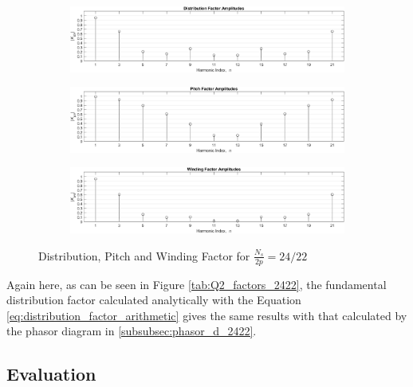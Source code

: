 \documentclass[a4paper, 11pt]{article}
\begin{document}
\begin{figure}[h!]
    \centering
    \begin{subfigure}[b]{1.00\textwidth}
        \includegraphics[width=\textwidth]{Q2_2422_distributionFactor.png}
        \caption{}
        \label{subfig:Q2_dist_factor_2422}
    \end{subfigure}
    \begin{subfigure}[b]{1.00\textwidth}
        \includegraphics[width=\textwidth]{Q2_2422_pitchFactor.png}
        \caption{}
        \label{subfig:Q2_pitch_factor_2422}
    \end{subfigure}
    \begin{subfigure}[b]{1.00\textwidth}
        \includegraphics[width=\textwidth]{Q2_2422_windingFactor.png}
        \caption{}
        \label{subfig:Q2_wind_factor_2422}
    \end{subfigure}
    \caption{Distribution, Pitch and Winding Factor for $\frac{N_s}{2p}=24/22$}
    \label{fig:Q2_factors_2422}
\end{figure}

Again here, as can be seen in Figure \ref{tab:Q2_factors_2422}, the fundamental distribution factor calculated analytically with the Equation \ref{eq:distribution_factor_arithmetic} gives the same results with that calculated by the phasor diagram in \ref{subsubsec:phasor_d_2422}.

\subsection{Evaluation}
\end{document}
